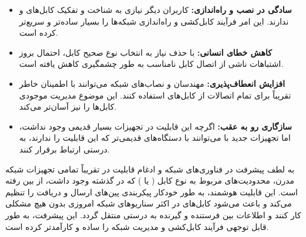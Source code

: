 \begin{itemize}
	\item \textbf{سادگی در نصب و راه‌اندازی:} کاربران دیگر نیازی به شناخت و تفکیک کابل‌های  و  ندارند. این امر فرآیند کابل‌کشی و راه‌اندازی شبکه‌ها را بسیار ساده‌تر و سریع‌تر کرده است.
	\item \textbf{کاهش خطای انسانی:} با حذف نیاز به انتخاب نوع صحیح کابل، احتمال بروز اشتباهات ناشی از اتصال کابل نامناسب به طور چشمگیری کاهش یافته است.
	\item \textbf{افزایش انعطاف‌پذیری:} مهندسان و نصاب‌های شبکه می‌توانند با اطمینان خاطر تقریباً برای تمام اتصالات از کابل‌های  استفاده کنند. این موضوع مدیریت موجودی کابل‌ها را نیز آسان‌تر می‌کند.
	\item \textbf{سازگاری رو به عقب:} اگرچه این قابلیت در تجهیزات بسیار قدیمی وجود نداشت، اما تجهیزات جدید با  می‌توانند با دستگاه‌های قدیمی‌تر که این قابلیت را ندارند، به درستی ارتباط برقرار کنند.
\end{itemize}

به لطف پیشرفت در فناوری‌های شبکه و ادغام قابلیت  در تقریباً تمامی تجهیزات شبکه مدرن، محدودیت‌های مربوط به نوع کابل ( یا ) که در گذشته وجود داشت، از بین رفته است. این قابلیت هوشمند، به طور خودکار پیکربندی پین‌های ارسال و دریافت را تنظیم می‌کند و باعث می‌شود کابل‌های  در اکثر سناریوهای شبکه امروزی بدون هیچ مشکلی کار کنند و اطلاعات بین فرستنده و گیرنده به درستی منتقل گردد. این پیشرفت، به طور قابل توجهی فرآیند کابل‌کشی و مدیریت شبکه را ساده و کارآمدتر کرده است.




